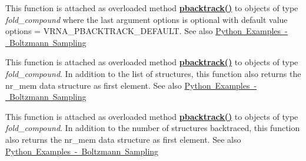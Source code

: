 \begin{DoxyRefList}
\item[Global \mbox{\hyperlink{group__subopt__stochbt_ga596ed9bcd86f629a7c7c59c58b297db5}{vrna\+\_\+pbacktrack\+\_\+num}} (vrna\+\_\+fold\+\_\+compound\+\_\+t $\ast$fc, unsigned int num\+\_\+samples, unsigned int options)]\label{wrappers__wrappers000008}%
%
 This function is attached as overloaded method {\bfseries{\mbox{\hyperlink{group__subopt__stochbt__deprecated_gac03ca6db186bb3bf0a2a326d7fb3ba03}{pbacktrack()}}}} to objects of type {\itshape fold\+\_\+compound} where the last argument {\ttfamily options} is optional with default value {\ttfamily options = V\+R\+N\+A\+\_\+\+P\+B\+A\+C\+K\+T\+R\+A\+C\+K\+\_\+\+D\+E\+F\+A\+U\+LT}. See also \mbox{\hyperlink{examples_python_examples_python_pbacktrack}{Python Examples -\/ Boltzmann Sampling}}  
\item[Global \mbox{\hyperlink{group__subopt__stochbt_gae175129ece546fe7c092f27072e039d1}{vrna\+\_\+pbacktrack\+\_\+resume}} (vrna\+\_\+fold\+\_\+compound\+\_\+t $\ast$fc, unsigned int num\+\_\+samples, vrna\+\_\+pbacktrack\+\_\+mem\+\_\+t $\ast$nr\+\_\+mem, unsigned int options)]\label{wrappers__wrappers000012}%
%
 This function is attached as overloaded method {\bfseries{\mbox{\hyperlink{group__subopt__stochbt__deprecated_gac03ca6db186bb3bf0a2a326d7fb3ba03}{pbacktrack()}}}} to objects of type {\itshape fold\+\_\+compound}. In addition to the list of structures, this function also returns the {\ttfamily nr\+\_\+mem} data structure as first element. See also \mbox{\hyperlink{examples_python_examples_python_pbacktrack}{Python Examples -\/ Boltzmann Sampling}}  
\item[Global \mbox{\hyperlink{group__subopt__stochbt_ga6fc5ce952995e53baef52cad5581c063}{vrna\+\_\+pbacktrack\+\_\+resume\+\_\+cb}} (vrna\+\_\+fold\+\_\+compound\+\_\+t $\ast$fc, unsigned int num\+\_\+samples, vrna\+\_\+boltzmann\+\_\+sampling\+\_\+callback $\ast$cb, void $\ast$data, vrna\+\_\+pbacktrack\+\_\+mem\+\_\+t $\ast$nr\+\_\+mem, unsigned int options)]\label{wrappers__wrappers000014}%
%
 This function is attached as overloaded method {\bfseries{\mbox{\hyperlink{group__subopt__stochbt__deprecated_gac03ca6db186bb3bf0a2a326d7fb3ba03}{pbacktrack()}}}} to objects of type {\itshape fold\+\_\+compound}. In addition to the number of structures backtraced, this function also returns the {\ttfamily nr\+\_\+mem} data structure as first element. See also \mbox{\hyperlink{examples_python_examples_python_pbacktrack}{Python Examples -\/ Boltzmann Sampling}}  

\end{DoxyRefList}
